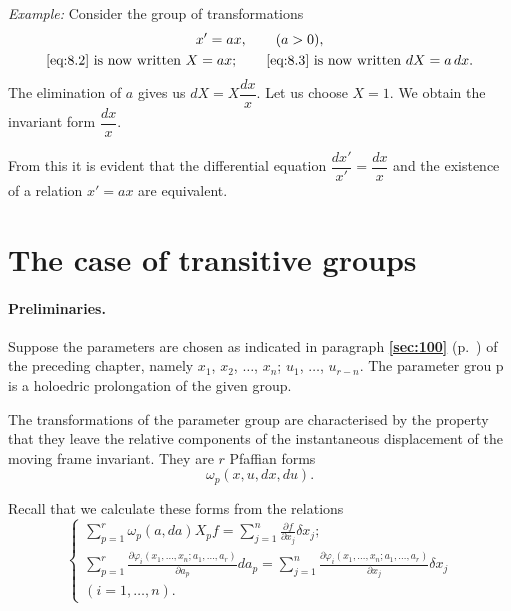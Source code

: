 \documentclass[leqno,11pt]{book}
\makeatletter
\numberwithin{equation}{chapter}
\newcommand{\pd}{\partial}
\theoremstyle{shape1}
\theoremstyle{shapesmall}
\let\old@phi\phi
\let\old@varphi\varphi
\let\phi\old@varphi
\let\varphi\old@phi
\newcommand{\fsref}[1]{{\rm\textsection\textbf{\ref{sec:#1}}}}
\newcommand{\somespace}{\vspace{9pt}}
\makeatother
\begin{document}
\somespace

{\small
\emph{Example:} Consider the group of transformations
\begin{gather*}
  x'=ax,\qquad(a>0),\\
  \text{\eqref{eq:8.2} is now written }X=ax;\qquad
  \text{\eqref{eq:8.3} is now written }dX=a\,dx.
\end{gather*}
The elimination of $a$ gives us $dX=X\dfrac{dx}{x}$. Let us choose $X=1$. We obtain the invariant form $\dfrac{dx}{x}$.

From this it is evident that the differential equation $\dfrac{dx'}{x'}=\dfrac{dx}{x}$ and the existence of a relation $x'=ax$ are equivalent.}



\section{The case of transitive groups}
\label{sec:case-trans-groups}

\paragraph{Preliminaries.}
\label{sec:108}
Suppose the parameters are chosen as indicated in paragraph \fsref{100} (p.~\pageref{sec:100}) of the preceding chapter, namely $x_{1}$, $x_{2}$, $\dots$, $x_{n}$; $u_{1}$, $\dots$, $u_{r-n}$. The parameter grou p is a holoedric prolongation of the given group.

The transformations of the parameter group are characterised by the property that they leave the relative components of the instantaneous displacement of the moving frame invariant. They are $r$ Pfaffian forms
\[
\omega_{p}(x,u,dx,du).
\]

Recall that we calculate these forms from the relations
\begin{equation}
  \label{eq:8.6}
  \left\{
    \begin{gathered}
      \sum_{p=1}^{r}\omega_{p}(a,da)X_{p}f=\sum_{j=1}^{n}\frac{\pd f}{\pd x_{j}}\delta x_{j};\\
      \sum_{p=1}^{r}\frac{\pd\phi_{i}(x_{1},\dots,x_{n};a_{1},\dots,a_{r})}{\pd a_{p}}da_{p}=\sum_{j=1}^{n}\frac{\pd \phi_{i}(x_{1},\dots,x_{n};a_{1},\dots,a_{r})}{\pd x_{j}}\delta x_{j}\\
      (i=1,\dots,n).
    \end{gathered}
  \right.
\end{equation}

\somespace
\end{document}
